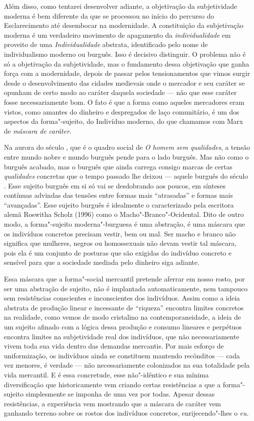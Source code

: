 Além disso, como tentarei desenvolver adiante, a objetivação da
subjetividade moderna é bem diferente da que se processou no início do
percurso do Esclarecimento até desembocar na modernidade. A constituição
da subjetivação moderna é um verdadeiro movimento de apagamento da
\emph{individualidade} em proveito de uma \emph{Individualidade}
abstrata, identificado pelo nome de individualismo moderno ou burguês.
Isso é decisivo distinguir. O problema não é só a objetivação da
subjetividade, mas o fundamento dessa objetivação que ganha força com a
modernidade, depois de passar pelos tensionamentos que vimos surgir
desde o desenvolvimento das cidades medievais onde o mercador e seu
caráter se opunham de certo modo ao caráter daquela sociedade --- não que
esse caráter fosse necessariamente bom. O fato é que a forma como
aqueles mercadores eram vistos, como amantes do dinheiro e despregados
de laço comunitário, é um dos aspectos da forma"-sujeito, do Indivíduo
moderno, do que chamamos com Marx de \emph{máscara de caráter.}

Na aurora do século , que é o quadro social de \emph{O homem sem
qualidades}, a tensão entre mundo nobre e mundo burguês pende para o
lado burguês. Mas não como o burguês acabado, mas o burguês que ainda
carrega consigo marcas de certas \emph{qualidades} concretas que o tempo
passado lhe deixou --- aquele burguês do século . Esse sujeito burguês
em si só vai se desdobrando aos poucos, em sínteses contínuas advindas
das tensões entre formas mais ``atrasadas'' e formas mais ``avançadas''.
Esse sujeito burguês é idealmente o caracterizado pela escritora alemã
Roswitha Scholz (1996) como o Macho"-Branco"-Ocidental. Dito de outro modo,
a forma"-sujeito moderna"-burguesa é uma abstração, é uma máscara que os
indivíduos concretos precisam vestir, bem ou mal. Ser macho e branco não
significa que mulheres, negros ou homossexuais não devam vestir tal
máscara, pois ela é um conjunto de posturas que são exigidas do
indivíduo concreto e sensível para que a sociedade mediada pelo dinheiro
siga adiante.

Essa máscara que a forma"-social mercantil pretende aferrar em nosso
rosto, por ser uma abstração de sujeito, não é implantada
automaticamente, nem tampouco sem resistências conscientes e
inconscientes dos indivíduos. Assim como a ideia abstrata de produção
linear e incessante de ``riqueza'' encontra limites concretos na
realidade, como vemos de modo cristalino na contemporaneidade, a ideia
de um sujeito afinado com a lógica dessa produção e consumo lineares e
perpétuos encontra limites na subjetividade real dos indivíduos, que não
necessariamente vivem toda sua vida dentro das demandas mercantis. Por
mais esforço de uniformização, os indivíduos ainda se constituem
mantendo recônditos --- cada vez menores, é verdade --- não
necessariamente colonizados na sua totalidade pela vida mercantil. E é
essa concretude, esse não"-idêntico e sua mínima diversificação que
historicamente vem criando certas resistências a que a forma"-sujeito
simplesmente se imponha de uma vez por todas. Apesar dessas
resistências, a experiência vem mostrando que a máscara de caráter vem
ganhando terreno sobre os rostos dos indivíduos concretos,
enrijecendo"-lhes o \emph{eu.}

